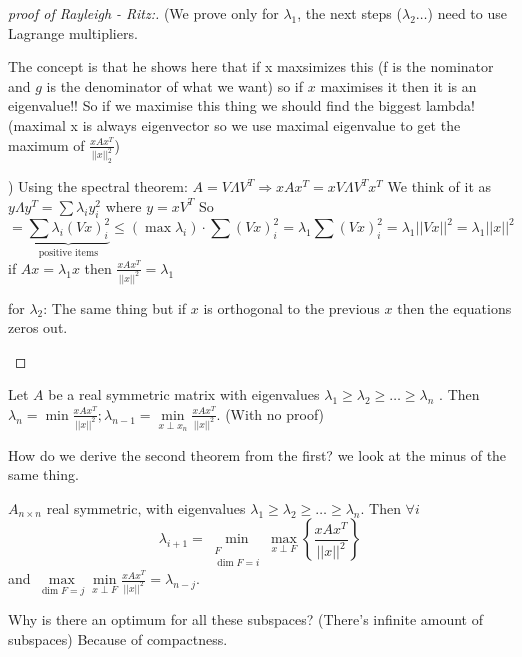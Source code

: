 \begin{proof}[proof of Rayleigh - Ritz:]
 (We prove only for $\lambda_{1}$, the next steps ($\lambda_{2}\dots$)
need to use Lagrange multipliers. %
\begin{insight}
The concept is that he shows here that if x maxsimizes this (f is
the nominator and $g$ is the denominator of what we want) so if $x$
maximises it then it is an eigenvalue!! So if we maximise this thing
we should find the biggest lambda! (maximal x is always eigenvector
so we use maximal eigenvalue to get the maximum of $\frac{xAx^{T}}{\left|\left|x\right|\right|_{2}^{2}}$)%
\end{insight}
) Using the spectral theorem: $A=V\Lambda V^{T}\Rightarrow$$xAx^{T}=xV\Lambda V^{T}x^{T}$
We think of it as $y\Lambda y^{T}=\sum\lambda_{i}y_{i}^{2}$ where
$y=xV^{T}$ So 
\[
=\underbrace{\sum\lambda_{i}\left(Vx\right)_{i}^{2}}_{\text{positive items}}\le\left(\max\lambda_{i}\right)\cdot\sum\left(Vx\right)_{i}^{2}=\lambda_{1}\sum\left(Vx\right)_{i}^{2}=\lambda_{1}\left|\left|Vx\right|\right|^{2}=\lambda_{1}\left|\left|x\right|\right|^{2}
\]
 if $Ax=\lambda_{1}x$ then $\frac{xAx^{T}}{\left|\left|x\right|\right|^{2}}=\lambda_{1}$%
\begin{insight}
for $\lambda_{2}$: The same thing but if $x$ is orthogonal to the
previous $x$ then the equations zeros out.%
\end{insight}
\end{proof}
%
\begin{thm}
 Let $A$ be a real symmetric matrix with eigenvalues $\lambda_{1}\ge\lambda_{2}\ge\dots\ge\lambda_{n}$
. Then$\lambda_{n}=\min\frac{xAx^{T}}{\left|\left|x\right|\right|^{2}};$$\lambda_{n-1}=\min\limits _{x\perp x_{n}}\frac{xAx^{T}}{\left|\left|x\right|\right|^{2}}$.
(With no proof)
\end{thm}

How do we derive the second theorem from the first? we look at the
minus of the same thing.
\begin{thm}
 $A_{n\times n}$ real symmetric, with eigenvalues $\lambda_{1}\ge\lambda_{2}\ge\dots\ge\lambda_{n}$.
Then $\forall i$ 
\[
\lambda_{i+1}=\min_{\begin{array}{c}
F\\
\dim F=i
\end{array}}\max_{x\perp F}\left\{ \frac{xAx^{T}}{\left|\left|x\right|\right|^{2}}\right\} 
\]
 and $\max\limits _{\dim F=j}\min\limits _{x\perp F}\frac{xAx^{T}}{\left|\left|x\right|\right|^{2}}=\lambda_{n-j}$.
\begin{insight}
Why is there an optimum for all these subspaces? (There's infinite
amount of subspaces) Because of compactness.%
\end{insight}
\end{thm}

